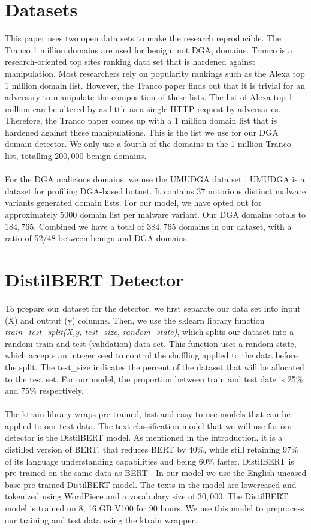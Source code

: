 \section{Datasets}
This paper uses two open data sets to make the research reproducible. The Tranco 1 million domains \cite{Tranco} are used for benign, not DGA, domains. Tranco is a research-oriented top sites ranking data set that is hardened against manipulation. Most researchers \cite{Antonakakis}\cite{Lison}\cite{Highnam}\cite{TRAN20182401} rely on popularity rankings such as the Alexa top 1 million domain list. However, the Tranco paper \cite{Tranco} finds out that it is trivial for an adversary to manipulate the composition of these lists. The list of Alexa top 1 million can be altered by as little as a single HTTP request by adversaries. Therefore, the Tranco paper comes up with a 1 million domain list that is hardened against these manipulations. This is the list we use for our DGA domain detector. We only use a fourth of the domains in the 1 million Tranco list, totalling $200,000$ benign domains.\\\\
For the DGA malicious domains, we use the UMUDGA data set \cite{UMUDGA}. UMUDGA is a dataset for profiling DGA-based botnet. It contains 37 notorious distinct malware variants generated domain lists. For our model, we have opted out for approximately $5000$ domain list per malware variant. Our DGA domains totals to $184,765$. Combined we have a total of $384,765$ domains in our dataset, with a ratio of 52/48 between benign and DGA domains.

\section{DistilBERT Detector}
To prepare our dataset for the detector, we first separate our data set into input (X) and output (y) columns.  Then, we use the sklearn library function \textit{train\_test\_split(X,y, test\_size, random\_state)}, which splits our dataset into a random train and test (validation) data set. This function uses a random state, which accepts an integer seed to control the shuffling applied to the data before the split. The test\_size indicates the percent of the dataset that will be allocated to the test set. For our model, the proportion between train and test date is 25\% and 75\% respectively.\\\\
The ktrain library wraps pre trained, fast and easy to use models that can be applied to our text data. The text classification model that we will use for our detector is the DistilBERT \cite{Sanh2019DistilBERTAD} model. As mentioned in the introduction, it is a distilled version of BERT, that reduces BERT by 40\%, while still retaining 97\% of its language understanding capabilities and being 60\% faster. DistilBERT is pre-trained on the same data as BERT \cite{ColBERT}. In our model we use the English uncased base pre-trained DistilBERT model. The texts in the model are lowercased and tokenized using WordPiece \cite{WordPiece} and a vocabulary size of $30,000$. The DistilBERT model is trained on 8, 16 GB V100 for 90 hours. We use this model to preprocess our training and test data using the ktrain wrapper. 

